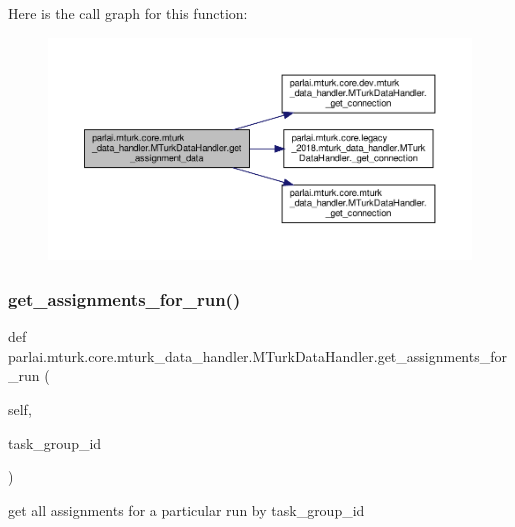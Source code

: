 Here is the call graph for this function\+:
\nopagebreak
\begin{figure}[H]
\begin{center}
\leavevmode
\includegraphics[width=350pt]{classparlai_1_1mturk_1_1core_1_1mturk__data__handler_1_1MTurkDataHandler_ab41299fc55cf09e4d0921aac63889a86_cgraph}
\end{center}
\end{figure}
\mbox{\label{classparlai_1_1mturk_1_1core_1_1mturk__data__handler_1_1MTurkDataHandler_ad08412db3d132299e287f182fef8b6dc}} 
\subsubsection{\texorpdfstring{get\+\_\+assignments\+\_\+for\+\_\+run()}{get\_assignments\_for\_run()}}
{\footnotesize\ttfamily def parlai.\+mturk.\+core.\+mturk\+\_\+data\+\_\+handler.\+M\+Turk\+Data\+Handler.\+get\+\_\+assignments\+\_\+for\+\_\+run (\begin{DoxyParamCaption}\item[{}]{self,  }\item[{}]{task\+\_\+group\+\_\+id }\end{DoxyParamCaption})}

\begin{DoxyVerb}get all assignments for a particular run by task_group_id\end{DoxyVerb}
 

